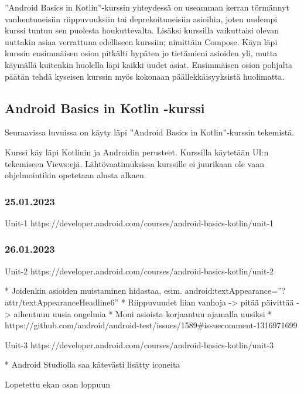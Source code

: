 ''Android Basics in Kotlin''-kurssin yhteydessä on useamman kerran törmännyt
vanhentuneisiin riippuvuuksiin tai deprekoituneisiin asioihin, joten uudempi
kurssi tuntuu sen puolesta houkuttevalta. Lisäksi kurssilla vaikuttaisi olevan
uuttakin asiaa verrattuna edelliseen kurssiin; nimittäin Compose. Käyn läpi
kurssin ensimmäisen osion pitkälti hypäten jo tietämieni asioiden yli, mutta
käymällä kuitenkin huolella läpi kaikki uudet asiat. Ensimmäisen osion pohjalta
päätän tehdä kyseisen kurssin myös kokonaan päällekkäisyyksistä huolimatta.

\subsection{Android Basics in Kotlin -kurssi}

Seuraavissa luvuissa on käyty läpi ''Android Basics in Kotlin''-kurssin
tekemistä.

Kurssi käy läpi Kotlinin ja Androidin perusteet. Kurssilla käytetään UI:n
tekemiseen Views:ejä. Lähtövaatimuksissa kurssille ei juurikaan ole vaan
ohjelmointikin opetetaan alusta alkaen.

\subsubsection{25.01.2023}



Unit-1 https://developer.android.com/courses/android-basics-kotlin/unit-1

\subsubsection{26.01.2023}

Unit-2 https://developer.android.com/courses/android-basics-kotlin/unit-2

* Joidenkin asioiden muistaminen hidastaa, esim. android:textAppearance=''?attr/textAppearanceHeadline6''
* Riippuvuudet liian vanhoja -> pitää päivittää -> aiheutuuu uusia ongelmia
* Moni asioista korjaantuu ajamalla uusiksi
* https://github.com/android/android-test/issues/1589\#issuecomment-1316971699

Unit-3 https://developer.android.com/courses/android-basics-kotlin/unit-3

* Android Studiolla saa kätevästi lisätty iconeita

Lopetettu ekan osan loppuun

